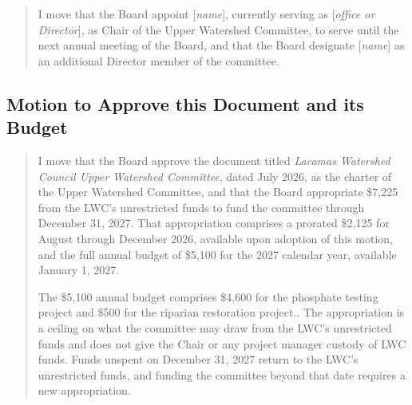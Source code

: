 \documentclass[letterpaper,11pt,leqno]{article}
\begin{document}
\begin{quote}
I move that the Board appoint [\emph{name}], currently serving as [\emph{office or Director}], as Chair of the Upper Watershed Committee, to serve until the next annual meeting of the Board, and that the Board designate [\emph{name}] as an additional Director member of the committee.
\end{quote}

\subsection{Motion to Approve this Document and its Budget}\label{a:motionApprove}

\begin{quote}
I move that the Board approve the document titled \emph{Lacamas Watershed Council Upper Watershed Committee}, dated July 2026, as the charter of the Upper Watershed Committee, and that the Board appropriate \$7,225 from the LWC's unrestricted funds to fund the committee through December 31, 2027. That appropriation comprises a prorated \$2,125 for August through December 2026, available upon adoption of this motion, and the full annual budget of \$5,100 for the 2027 calendar year, available January 1, 2027.

The \$5,100 annual budget comprises \$4,600 for the phosphate testing project and \$500 for the riparian restoration project.. The appropriation is a ceiling on what the committee may draw from the LWC's unrestricted funds and does not give the Chair or any project manager custody of LWC funds. Funds unspent on December 31, 2027 return to the LWC's unrestricted funds, and funding the committee beyond that date requires a new appropriation.
\end{quote}
\end{document}
